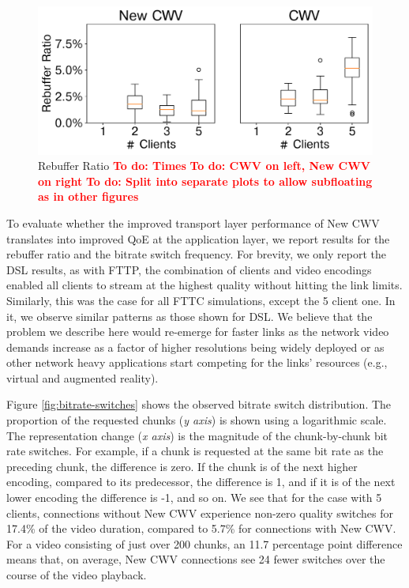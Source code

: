 \documentclass[10pt,sigconf,anonymous]{acmart}
\newcommand{\todo}[1]{\textbf{\textcolor{red}{To do: #1}}}
\begin{document}
\begin{figure}
      \includegraphics[width=.45\textwidth, keepaspectratio]{figures/Rebuffer_Ratio.pdf}
    \caption{Rebuffer Ratio \todo{Times} \todo{CWV on left, New CWV on right} \todo{Split into separate plots to allow subfloating as in other figures}}
    \label{fig:rebuffer-ratio}
\end{figure}

To evaluate whether the improved transport layer performance of New CWV translates into improved QoE at the application layer, we report results for the rebuffer ratio and the bitrate switch frequency. For brevity, we only report the DSL results, as with FTTP, the combination of clients and video encodings enabled all clients to stream at the highest quality without hitting the link limits. Similarly, this was the case for all FTTC simulations, except the 5 client one. In it, we observe similar patterns as those shown for DSL. We believe that the problem we describe here would re-emerge for faster links as the network video demands increase as a factor of higher resolutions being widely deployed or as other network heavy applications start competing for the links' resources (e.g., virtual and augmented reality).


Figure \ref{fig:bitrate-switches} shows the observed bitrate switch distribution. The proportion of the requested chunks (\emph{y axis}) is shown using a logarithmic scale. The representation change (\emph{x axis}) is the magnitude of the chunk-by-chunk bit rate switches. For example, if a chunk is requested at the same bit rate as the preceding chunk, the difference is zero. If the chunk is of the next higher encoding, compared to its predecessor, the difference is 1, and if it is of the next lower encoding the difference is -1, and so on. We see that for the case with 5 clients, connections without New CWV experience non-zero quality switches for 17.4\% of the video duration, compared to 5.7\% for connections with New CWV. For a video consisting of just over 200 chunks, an 11.7 percentage point difference means that, on average, New CWV connections see 24 fewer switches over the course of the video playback.
\end{document}
